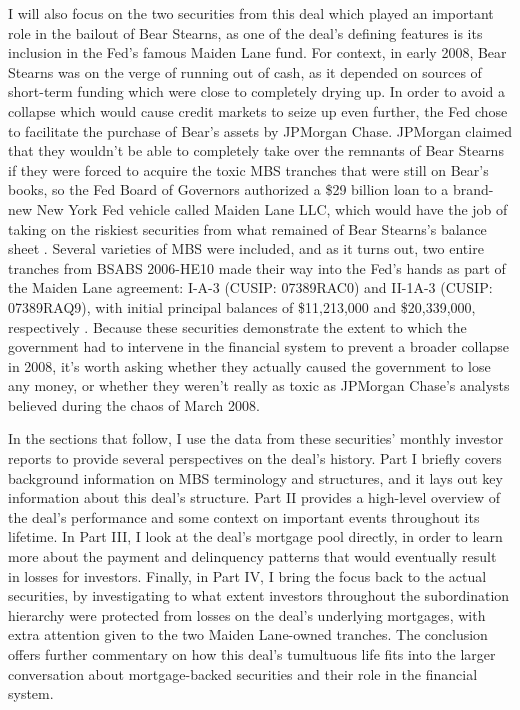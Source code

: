 \documentclass[12pt]{article}
\begin{document}
I will also focus on the two securities from this deal which played an important role in the bailout of Bear Stearns, as one of the deal's defining features is its inclusion in the Fed’s famous Maiden Lane fund. For context, in early 2008, Bear Stearns was on the verge of running out of cash, as it depended on sources of short-term funding which were close to completely drying up. In order to avoid a collapse which would cause credit markets to seize up even further, the Fed chose to facilitate the purchase of Bear’s assets by JPMorgan Chase. JPMorgan claimed that they wouldn’t be able to completely take over the remnants of Bear Stearns if they were forced to acquire the toxic MBS tranches that were still on Bear’s books, so the Fed Board of Governors authorized a \$29 billion loan to a brand-new New York Fed vehicle called Maiden Lane LLC, which would have the job of taking on the riskiest securities from what remained of Bear Stearns’s balance sheet \parencite{fcic09}. Several varieties of MBS were included, and as it turns out, two entire tranches from BSABS 2006-HE10 made their way into the Fed’s hands as part of the Maiden Lane agreement: I-A-3 (CUSIP: 07389RAC0) and II-1A-3 (CUSIP: 07389RAQ9), with initial principal balances of \$11,213,000 and \$20,339,000, respectively \parencite{fcic09}. Because these securities demonstrate the extent to which the government had to intervene in the financial system to prevent a broader collapse in 2008, it’s worth asking whether they actually caused the government to lose any money, or whether they weren’t really as toxic as JPMorgan Chase’s analysts believed during the chaos of March 2008.

In the sections that follow, I use the data from these securities' monthly investor reports to provide several perspectives on the deal’s history. Part I briefly covers background information on MBS terminology and structures, and it lays out key information about this deal’s structure. Part II provides a high-level overview of the deal’s performance and some context on important events throughout its lifetime. In Part III, I look at the deal’s mortgage pool directly, in order to learn more about the payment and delinquency patterns that would eventually result in losses for investors. Finally, in Part IV, I bring the focus back to the actual securities, by investigating to what extent investors throughout the subordination hierarchy were protected from losses on the deal’s underlying mortgages, with extra attention given to the two Maiden Lane-owned tranches. The conclusion offers further commentary on how this deal’s tumultuous life fits into the larger conversation about mortgage-backed securities and their role in the financial system.
\end{document}

